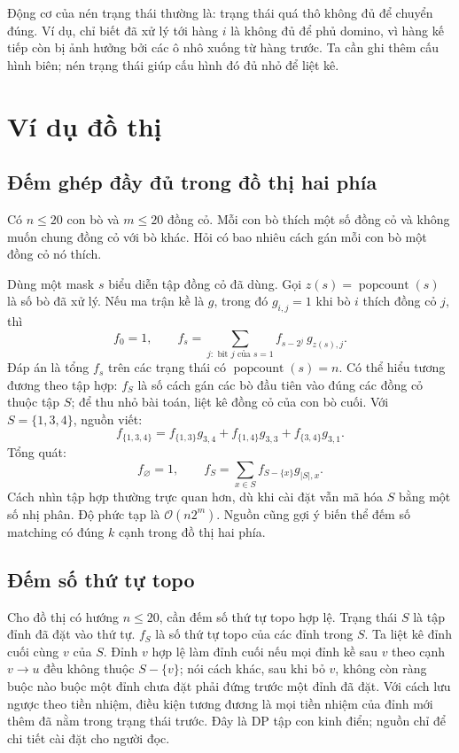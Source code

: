 \documentclass[11pt]{article}
\newcommand{\Oh}{\mathcal{O}}
\newcommand{\popcount}{\operatorname{popcount}}
\begin{document}
Động cơ của nén trạng thái thường là: trạng thái quá thô không đủ để chuyển
đúng. Ví dụ, chỉ biết đã xử lý tới hàng \(i\) là không đủ để phủ domino, vì
hàng kế tiếp còn bị ảnh hưởng bởi các ô nhô xuống từ hàng trước. Ta cần ghi
thêm cấu hình biên; nén trạng thái giúp cấu hình đó đủ nhỏ để liệt kê.

\section{Ví dụ đồ thị}

\subsection{Đếm ghép đầy đủ trong đồ thị hai phía}

Có \(n\le20\) con bò và \(m\le20\) đồng cỏ. Mỗi con bò thích một số đồng cỏ
và không muốn chung đồng cỏ với bò khác. Hỏi có bao nhiêu cách gán mỗi con bò
một đồng cỏ nó thích.

Dùng một mask \(s\) biểu diễn tập đồng cỏ đã dùng. Gọi \(z(s)=\popcount(s)\)
là số bò đã xử lý. Nếu ma trận kề là \(g\), trong đó \(g_{i,j}=1\) khi bò
\(i\) thích đồng cỏ \(j\), thì
\[
  f_0=1,\qquad
  f_s=\sum_{j:\text{ bit }j\text{ của }s=1}
       f_{s-2^j}\,g_{z(s),j}.
\]
Đáp án là tổng \(f_s\) trên các trạng thái có \(\popcount(s)=n\). Có thể hiểu
tương đương theo tập hợp: \(f_S\) là số cách gán các bò đầu tiên vào đúng các
đồng cỏ thuộc tập \(S\); để thu nhỏ bài toán, liệt kê đồng cỏ của con bò cuối.
Với \(S=\{1,3,4\}\), nguồn viết:
\[
  f_{\{1,3,4\}}=
  f_{\{1,3\}}g_{3,4}+f_{\{1,4\}}g_{3,3}+f_{\{3,4\}}g_{3,1}.
\]
Tổng quát:
\[
  f_{\varnothing}=1,\qquad
  f_S=\sum_{x\in S} f_{S-\{x\}}g_{|S|,x}.
\]
Cách nhìn tập hợp thường trực quan hơn, dù khi cài đặt vẫn mã hóa \(S\) bằng
một số nhị phân. Độ phức tạp là \(\Oh(n2^m)\). Nguồn cũng gợi ý biến thể đếm
số matching có đúng \(k\) cạnh trong đồ thị hai phía.

\subsection{Đếm số thứ tự topo}

Cho đồ thị có hướng \(n\le20\), cần đếm số thứ tự topo hợp lệ. Trạng thái
\(S\) là tập đỉnh đã đặt vào thứ tự. \(f_S\) là số thứ tự topo của các đỉnh
trong \(S\). Ta liệt kê đỉnh cuối cùng \(v\) của \(S\). Đỉnh \(v\) hợp lệ làm
đỉnh cuối nếu mọi đỉnh kề sau \(v\) theo cạnh \(v\to u\) đều không thuộc
\(S-\{v\}\); nói cách khác, sau khi bỏ \(v\), không còn ràng buộc nào buộc
một đỉnh chưa đặt phải đứng trước một đỉnh đã đặt. Với cách lưu ngược theo
tiền nhiệm, điều kiện tương đương là mọi tiền nhiệm của đỉnh mới thêm đã nằm
trong trạng thái trước. Đây là DP tập con kinh điển; nguồn chỉ để chi tiết
cài đặt cho người đọc.
\end{document}
